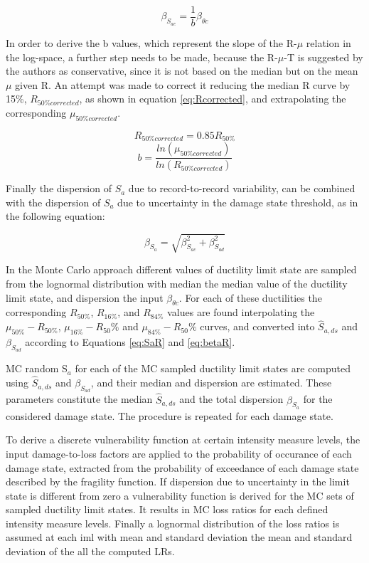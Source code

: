 \begin{equation}
\beta_{S_{a c}} = \frac{1}{b} \beta_{\theta c}
\label{eq:betasc_DF}
\end{equation}

In order to derive the b values, which represent the slope of the R-$\mu$ relation in the log-space, a further step needs to be made, because the R-$\mu$-T is suggested by the authors as conservative, since it is not based on the median but on the mean $\mu$ given R. An attempt was made to correct it reducing the median R curve by 15\%, $R_{50\% corrected}$, as shown in equation \ref{eq:Rcorrected}, and extrapolating the corresponding $\mu_{50\% corrected}$.

\begin{equation}
R_{50\% corrected}=0.85 R_{50\%}
\label{eq:Rcorrected}
\end{equation}
\begin{equation}
b = \frac{ln(\mu_{50\% corrected})}{ln(R_{50\% corrected})}
\label{eq:bcorrected_DF}
\end{equation}

Finally the dispersion of $S_a$ due to record-to-record variability, can be combined with the dispersion of $S_a$ due to uncertainty in the damage state threshold, as in the following equation:

\begin{equation}
\beta_{S_a} = \sqrt{\beta_{S_{a c}}^2+\beta_{S_{a d}}^2}
\label{eq:betatot_DF}
\end{equation}

In the Monte Carlo approach different values of ductility limit state are sampled from the lognormal distribution with median the median value of the ductility limit state, and dispersion the input $\beta_{\theta c}$.
For each of these ductilities the corresponding $R_{50\%}$, $R_{16\%}$, and $R_{84\%}$ values are found interpolating the $\mu_{50\%}-R_{50\%}$, $\mu_{16\%}-R_50\%$ and $\mu_{84\%}-R_50\%$ curves, and converted into $\hat{S}_{a,ds}$ and $\beta_{S_{a d}}$ according to Equations \ref{eq:SaR} and \ref{eq:betaR}.

MC random S$_a$ for each of the MC sampled ductility limit states are computed using $\hat{S}_{a,ds}$ and $\beta_{S_{a d}}$, and their median and dispersion are estimated. These parameters constitute the median $\hat{S}_{a,ds}$ and the total dispersion $\beta_{S_a}$ for the considered damage state. The procedure is repeated for each damage state.

To derive a discrete vulnerability function at certain intensity measure levels, the input damage-to-loss factors are applied to the probability of occurance of each damage state, extracted from the probability of exceedance of each damage state described by the fragility function.
If dispersion due to uncertainty in the limit state is different from zero a vulnerability function is derived for the MC sets of sampled ductility limit states. It results in MC loss ratios for each defined intensity measure levels. Finally a lognormal distribution of the loss ratios is assumed at each iml with mean and standard deviation the mean and standard deviation of the all the computed LRs.

